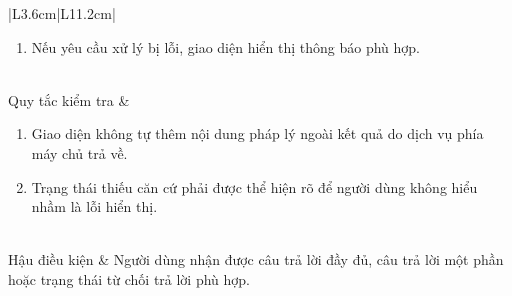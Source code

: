 \documentclass[12pt,a4paper,oneside]{report}
\begin{document}
{\begin{longtable}{|L{3.6cm}|L{11.2cm}|}
\begin{enumerate}[leftmargin=*,nosep]
                            \item Nếu yêu cầu xử lý bị lỗi, giao diện hiển thị thông báo phù hợp.
                          \end{enumerate} \\
    \hline
    Quy tắc kiểm tra    & \begin{enumerate}[leftmargin=*,nosep]
                            \item Giao diện không tự thêm nội dung pháp lý ngoài kết quả do dịch vụ phía máy chủ trả về.
                            \item Trạng thái thiếu căn cứ phải được thể hiện rõ để người dùng không hiểu nhầm là lỗi hiển thị.
                          \end{enumerate}            \\
    \hline
    Hậu điều kiện       & Người dùng nhận được câu trả lời đầy đủ, câu trả lời một phần hoặc trạng thái từ chối trả lời phù hợp.       \\
    \hline
  \end{longtable}
}
\end{document}
